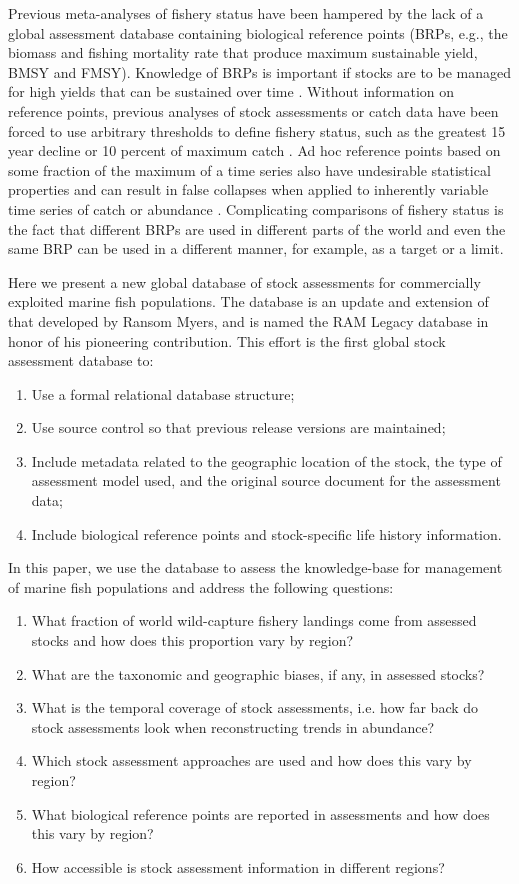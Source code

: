 \documentclass[letterpaper,12pt]{article}
\begin{document}
Previous meta-analyses of fishery status have been hampered by the
lack of a global assessment database containing biological reference
points (BRPs, e.g., the biomass and fishing mortality rate that
produce maximum sustainable yield, BMSY and FMSY).  Knowledge of BRPs
is important if stocks are to be managed for high yields that can be
sustained over time \citep{Mace:1994:cjfas}.  Without information on
reference points, previous analyses of stock assessments or catch data
have been forced to use arbitrary thresholds to define fishery status,
such as the greatest 15 year decline \citep{Hutchings:Reynolds:2004:biosci} or
10 percent of maximum catch \citep{Worm:etal:2006:science}. Ad hoc reference
points based on some fraction of the maximum of a time series also
have undesirable statistical properties and can result in false
collapses when applied to inherently variable time series of catch or
abundance \citep{branch:2008:marpol, Wilberg:Miller:2007:science}.
Complicating comparisons of fishery status is the fact that different
BRPs are used in different parts of the world and even the same BRP
can be used in a different manner, for example, as a target or a
limit.

Here we present a new global database of stock assessments for
commercially exploited marine fish populations.  The database is an
update and extension of that developed by Ransom Myers, and is named
the RAM Legacy database in honor of his pioneering contribution.  This
effort is the first global stock assessment database to:
\begin{enumerate}
\item Use a formal relational database structure;
\item Use source control so that previous release versions are maintained;
\item Include metadata related to the geographic location of the stock, the type of assessment model used, and the original source document for the assessment data;
\item Include biological reference points and stock-specific life history information. 
\end{enumerate}

In this paper, we use the database to assess the knowledge-base for management of marine fish populations and address the following questions:
\begin{enumerate}
\item What fraction of world wild-capture fishery landings come from assessed stocks and how does this proportion vary by region?
\item What are the taxonomic and geographic biases, if any, in assessed stocks?
\item What is the temporal coverage of stock assessments, i.e. how far back do stock assessments look when reconstructing trends in abundance?
\item Which stock assessment approaches are used and how does this vary by region?
\item What biological reference points are reported in assessments and how does this vary by region?
\item How accessible is stock assessment information in different regions?
\end{enumerate}
\end{document}
